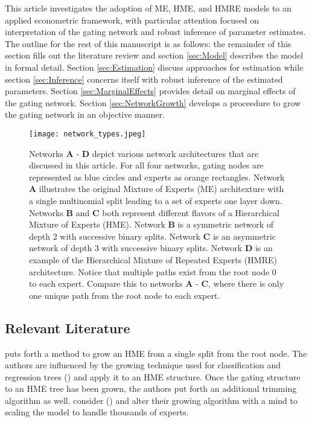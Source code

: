 \documentclass[12pt]{article}
\begin{document}
\bigskip

This article investigates the adoption of ME, HME, and HMRE models to an applied
econometric framework, with particular attention focused on interpretation of
the gating network and robust inference of parameter estimates. The outline for the
rest of this manuscript is as follows: the remainder of this section
fills out the literature review and section \ref{sec:Model} describes
the model in formal detail. Section \ref{sec:Estimation} discuss approaches
for estimation while section \ref{sec:Inference} concerns itself with robust
inference of the estimated parameters. Section \ref{sec:MarginalEffects}
provides detail on marginal effects of the gating network. Section
\ref{sec:NetworkGrowth} develops a proceedure to grow the gating network
in an objective manner. 

\begin{figure}[!ht]
  \centering
  \texttt{[image: network\_types.jpeg]}
  \caption{Networks \textbf{A} - \textbf{D} depict various network
  architectures that are discussed in this article. For all four networks,
  gating nodes are represented as blue circles and experts as orange
  rectangles. Network \textbf{A} illustrates the original Mixture of
  Experts (ME) architexture with a single multinomial split leading
  to a set of experts one layer down. Networks \textbf{B} and \textbf{C} both
  represent different flavors of a Hierarchical Mixture of Experts (HME). Network
  \textbf{B} is a symmetric network of depth 2 with successive binary splits.
  Network \textbf{C} is an asymmetric network of depth 3 with successive
  binary splits. Network \textbf{D} is an example of the Hierarchical
  Mixture of Repeated Experts (HMRE) architecture. Notice that multiple paths
  exist from the root node $0$ to each expert. Compare this to networks
  \textbf{A} - \textbf{C}, where there is only one unique path from the root
  node to each expert.}
  \label{fig:network_comparison}
\end{figure}


\subsection{Relevant Literature}

\cite{WaterhouseRobinson1995} puts forth a method to grow an HME from a 
single split from the root node. The authors are influenced by the growing
technique used for classification and regression trees (\cite{CART1984}) and
apply it to an HME structure. Once the gating structure to an HME tree has
been grown, the authors put forth an additional trimming algorithm as well.
\cite{FFW1997} consider (\cite{WaterhouseRobinson1995}) and alter their
growing algorithm with a mind to scaling the model to handle thousands of
experts.
\end{document}
